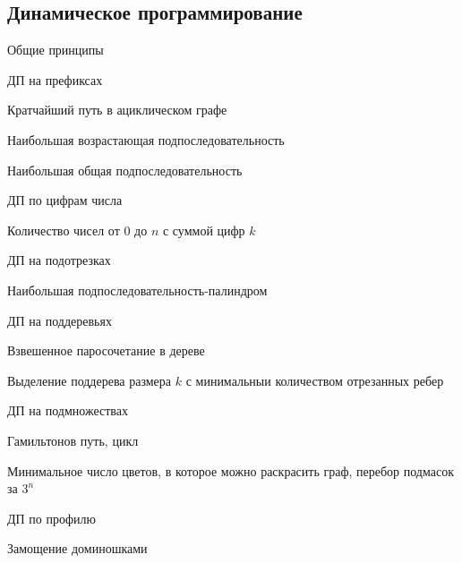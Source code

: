 \documentclass[a4paper,12pt]{article}
\begin{document}
\begin{multicols}{2}
  \section{Динамическое программирование}
    \begin{compactenum}
      \item Общие принципы
      \item ДП на префиксах
        \begin{compactenum}
          \item Кратчайший путь в ациклическом графе
          \item Наибольшая возрастающая подпоследовательность
          \item Наибольшая общая подпоследовательность
        \end{compactenum}
      \item ДП по цифрам числа
        \begin{compactenum}
          \item Количество чисел от $0$ до $n$ с суммой цифр $k$
        \end{compactenum}
      \item ДП на подотрезках
        \begin{compactenum}
          \item Наибольшая подпоследовательность-палиндром
        \end{compactenum}
      \item ДП на поддеревьях
        \begin{compactenum}
          \item Взвешенное паросочетание в дереве
          \item Выделение поддерева размера $k$ с минимальныи количеством отрезанных ребер
        \end{compactenum}
      \item ДП на подмножествах
        \begin{compactenum}
          \item Гамильтонов путь, цикл
          \item Минимальное число цветов, в которое можно раскрасить граф, перебор подмасок за $3^n$
        \end{compactenum}
      \item ДП по профилю
        \begin{compactenum}
          \item Замощение доминошками
        \end{compactenum}
    \end{compactenum}


\end{multicols}
\end{document}
